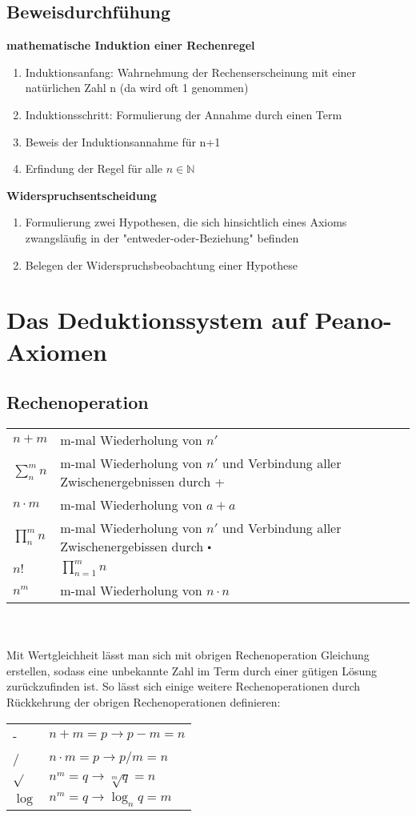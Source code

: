 \documentclass{article}
\begin{document}
    \subsection{Beweisdurchfühung}
    \textbf{mathematische Induktion einer Rechenregel}
    \begin{enumerate}
        \item Induktionsanfang: Wahrnehmung der Rechenserscheinung mit einer natürlichen Zahl n (da wird oft 1 genommen)
        \item Induktionsschritt: Formulierung der Annahme durch einen Term
        \item Beweis der Induktionsannahme für n+1
        \item Erfindung der Regel für alle $n\in \mathbb{N}$
    \end{enumerate}
    \textbf{Widerspruchsentscheidung}
    \begin{enumerate}
        \item Formulierung zwei Hypothesen, die sich hinsichtlich eines Axioms zwangsläufig in der "entweder-oder-Beziehung" befinden
        \item Belegen der Widerspruchsbeobachtung einer Hypothese
    \end{enumerate}
    \pagebreak
    
    \section{Das Deduktionssystem auf Peano-Axiomen}
    \subsection{Rechenoperation}
    \begin{tabular}{ll}
        $n+m$&m-mal Wiederholung von $n'$\\
        $\sum_{n}^{m} n$& m-mal Wiederholung von $n'$ und Verbindung aller Zwischenergebnissen durch +\\
        $n\cdot m$ &m-mal Wiederholung von $a+a$   \\
        $\prod _{n}^{m} n$ & m-mal Wiederholung von $n'$ und Verbindung aller Zwischenergebissen durch $\centerdot$\\
        $n!$ & $\prod _{n=1}^{m} n$\\
        $n^m$ &m-mal Wiederholung von $n\cdot n$\\
    \end{tabular}\\\\
    Mit Wertgleichheit lässt man sich mit obrigen Rechenoperation Gleichung erstellen, sodass eine unbekannte Zahl im Term durch einer gütigen Lösung zurückzufinden ist.
    So lässt sich einige weitere Rechenoperationen durch Rückkehrung der obrigen Rechenoperationen definieren:\\
    \begin{tabular}{ll}
        - & $n+m=p\rightarrow p-m=n$ \\
        / & $n\cdot m=p \rightarrow p/m=n$\\
        $\sqrt{}$ & $n^m=q\rightarrow \sqrt[m]{q}=n $\\
        $\log$ & $n^m=q \rightarrow \log_{n}q=m$\\
    \end{tabular}
\end{document}
